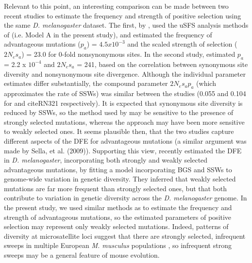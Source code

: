 	Relevant to this point, an interesting comparison can be made between two recent studies to estimate the frequency and strength of positive selection using the same \textit{D. melanogaster} dataset. The first, by \cite{RN321}, used the uSFS analysis methods of \cite{RN210} (i.e. Model A in the present study), and estimated the frequency of advantageous mutations ($p_a$) = $4.5 x 10^{-3}$ and the scaled strength of selection ($2N_es_a$) = 23.0 for 0-fold nonsynonymous sites. In the second study,  \cite{RN290} estimated $p_a$ = 2.2 x $10^{-4}$ and $2N_es_a$ = 241, based on the correlation between synonymous site diversity and nonsynonymous site divergence. Although the individual parameter estimates differ substantially, the compound parameter $2N_es_ap_a$ (which approximates the rate of SSWs) was similar between the studies (0.055 and 0.104 for \cite{RN290} and cite{RN321} respectively). It is expected that synonymous site diversity is reduced by SSWs, so the method used by \cite{RN290} may be sensitive to the presence of strongly selected mutations, whereas the \cite{RN321} approach may have been more sensitive to weakly selected ones. It seems plausible then, that the two studies capture different aspects of the DFE for advantageous mutations (a similar argument was made by Sella, et al. (2009)). Supporting this view, \cite{RN274} recently estimated the DFE in \textit{D. melanogaster}, incorporating both strongly and weakly selected advantageous mutations, by fitting a model incorporating BGS and SSWs to genome-wide variation in genetic diversity. They inferred that weakly selected mutations are far more frequent than strongly selected ones, but that both contribute to variation in genetic diversity across the \textit{D. melanogaster} genome. In the present study, we used similar methods as \cite{RN321} to estimate the frequency and strength of advantageous mutations, so the estimated parameters of positive selection may represent only weakly selected mutations. Indeed, patterns of diversity at microsatellite loci suggest that there are strongly selected, infrequent sweeps in multiple European \textit{M. musculus} populations \citep{RN355}, so infrequent strong sweeps may be a general feature of mouse evolution.

